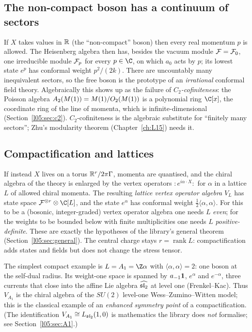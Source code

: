 \subsection{The non-compact boson has a continuum of sectors}

If $X$ takes values in $\mathbb{R}$ (the ``non-compact'' boson) then every real momentum $p$ is allowed.
The Heisenberg algebra then has, besides the vacuum module $\mathcal{F}=\mathcal{F}_0$, one irreducible
module $\mathcal{F}_p$ for every $p\in\C$, on which $a_0$ acts by $p$; its lowest state $e^{p}$ has
conformal weight $p^2/(2k)$. There are uncountably many inequivalent sectors, so the free boson is the
prototype of an \emph{irrational} conformal field theory. Algebraically this shows up as the failure
of \emph{$C_2$-cofiniteness}: the Poisson algebra $A_2(M(1))=M(1)/O_2(M(1))$ is a polynomial
ring $\C[x]$, the coordinate ring of the line of momenta, which is infinite-dimensional
(Section~\ref{l05:sec:c2}). $C_2$-cofiniteness is the algebraic substitute for ``finitely many
sectors''; Zhu's modularity theorem (Chapter~\ref{ch:L15}) needs it.

\subsection{Compactification and lattices}

If instead $X$ lives on a torus $\mathbb{R}^r/2\pi\Gamma$, momenta are quantised, and the chiral algebra of
the theory is enlarged by the vertex operators ${:}e^{i\alpha\cdot X}{:}$ for $\alpha$ in a lattice $L$
of allowed chiral momenta. The resulting \emph{lattice vertex operator algebra} $V_L$ has state space
$\lfiveF^{\otimes r}\otimes\C[L]$, and the state $e^\alpha$ has conformal weight
$\frac12\langle\alpha,\alpha\rangle$. For this to be a (bosonic, integer-graded) vertex operator
algebra one needs $L$ \emph{even}; for the weights to be bounded below with finite multiplicities one
needs $L$ \emph{positive-definite}. These are exactly the hypotheses of the library's general theorem
(Section~\ref{l05:sec:general}). The central charge stays $r=\operatorname{rank}L$: compactification
adds states and fields but does not change the stress tensor.

The simplest compact example is $L=A_1=\Z\alpha$ with $\langle\alpha,\alpha\rangle=2$: one boson at
the self-dual radius. Its weight-one space is spanned by $a_{-1}\mathbf{1}$, $e^{\alpha}$ and $e^{-\alpha}$, three
currents that close into the affine Lie algebra $\widehat{\mathfrak{sl}_2}$ at level one (Frenkel--Kac). Thus
$V_{A_1}$ is the chiral algebra of the $SU(2)$ level-one Wess--Zumino--Witten model; this is the
classical example of an \emph{enhanced symmetry point} of a compactification. (The identification
$V_{A_1}\cong L_{\mathfrak{sl}_2}(1,0)$ is mathematics the library does \emph{not} formalise; see
Section~\ref{l05:sec:A1}.)


